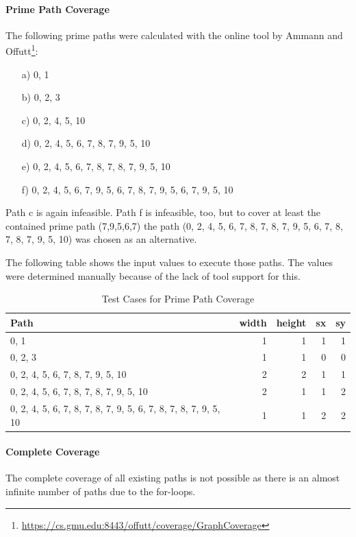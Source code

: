 \documentclass{scrreprt}
\begin{document}
\paragraph{Prime Path Coverage} The following prime paths were calculated with the online tool by Ammann and Offutt\footnote{\url{https://cs.gmu.edu:8443/offutt/coverage/GraphCoverage}}:

\begin{itemize}
	\item[a)] 0, 1
	\item[b)] 0, 2, 3
	\item[c)] 0, 2, 4, 5, 10
	\item[d)] 0, 2, 4, 5, 6, 7, 8, 7, 9, 5, 10
	\item[e)] 0, 2, 4, 5, 6, 7, 8, 7, 8, 7, 9, 5, 10
	\item[f)] 0, 2, 4, 5, 6, 7, 9, 5, 6, 7, 8, 7, 9, 5, 6, 7, 9, 5, 10
\end{itemize}

Path c is again infeasible. Path f is infeasible, too, but to cover at least the contained prime path (7,9,5,6,7) the path (0, 2, 4, 5, 6, 7, 8, 7, 8, 7, 9, 5, 6, 7, 8, 7, 8, 7, 9, 5, 10) was chosen as an alternative.

The following table shows the input values to execute those paths. The values were determined manually because of the lack of tool support for this.

\begin{table}[h]
	\centering
	\caption{Test Cases for Prime Path Coverage}
	\begin{tabular}{l|r|r|r|r}
		Path           & width & height & sx & sy  \\ \hline
		0, 1           &     1 &      1 &  1 &  1  \\
		0, 2, 3        &     1 &      1 &  0 &  0  \\
		0, 2, 4, 5, 6, 7, 8, 7, 9, 5, 10        &     2 &      2 &  1 &  1  \\
		0, 2, 4, 5, 6, 7, 8, 7, 8, 7, 9, 5, 10  &     2 &      1 &  1 &  2  \\
		0, 2, 4, 5, 6, 7, 8, 7, 8, 7, 9, 5, 6, 7, 8, 7, 8, 7, 9, 5, 10 &     1 &      1 &  2 &  2  \\
	\end{tabular}
\end{table}

\paragraph{Complete Coverage} The complete coverage of all existing paths is not possible as there is an almost infinite number of paths due to the for-loops.
\end{document}
